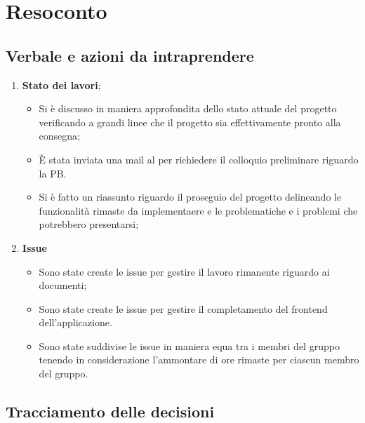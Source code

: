\section{Resoconto}
\subsection{Verbale e azioni da intraprendere}

\begin{enumerate}
	\item \textbf{Stato dei lavori};
	\begin{itemize}
		\item Si è discusso in maniera approfondita dello stato attuale del progetto verificando a grandi linee che il progetto sia effettivamente pronto alla consegna;
		\item È stata inviata una mail al \commitNameS{} per richiedere il colloquio preliminare riguardo la PB.
		\item Si è fatto un riassunto riguardo il proseguio del progetto delineando  le funzionalità rimaste da implementaere e le problematiche e i problemi che potrebbero presentarsi;
	\end{itemize}

	\item \textbf{Issue}
	\begin{itemize}
		\item Sono state create le issue  per gestire il lavoro rimanente riguardo ai documenti;
		\item Sono state create le issue per gestire il completamento del frontend dell'applicazione.
		\item Sono state suddivise le issue in maniera equa tra i membri del gruppo tenendo in considerazione l'ammontare di ore rimaste per ciascun membro del gruppo.
	\end{itemize}
\end{enumerate}

\pagebreak

\subsection{Tracciamento delle decisioni}

